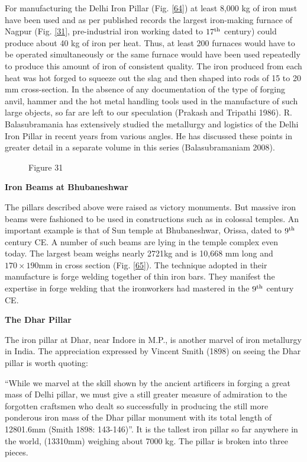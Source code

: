 For manufacturing the Delhi Iron Pillar (Fig. \ref{64}) at least 8,000 kg of iron must have been used and as per published records the largest iron-making furnace of Nagpur (Fig. \ref{31}, pre-industrial iron working dated to $17^{\rm th}$ century) could produce about 40 kg of iron per heat. Thus, at least 200 furnaces would have to be operated simultaneously or the same furnace would have been used repeatedly to produce this amount of iron of consistent quality. The iron produced from each heat was hot­ forged to squeeze out the slag and then shaped into rods of 15 to 20 mm cross-section. In the absence of any documentation of the type of forging anvil, hammer and the hot metal handling tools used in the manufacture of such large objects, so far are left to our speculation (Prakash and Tripathi 1986). R. Balasubramania has extensively studied the metallurgy and logistics of the Delhi Iron Pillar in recent years from various angles. He has discussed these points in greater detail in a separate volume in this series (Balasubramaniam 2008).
\begin{figure}[H]
\centerline{Figure 31}
\end{figure}

\noindent \textbf{\large Iron Beams at Bhubaneshwar}

The pillars described above were raised as victory monuments. But massive iron beams were fashioned to be used in constructions such as in colossal temples. An important example is that of Sun temple at Bhubaneshwar, Orissa, dated to $9^{\rm th}$ century CE. A number of such beams are lying in the temple complex even today. The largest beam weighs nearly 2721kg and is 10,668 mm long and $170 \times 190$mm in cross section  (Fig. \ref{65}). The technique adopted in their manufacture is forge welding together of thin iron bars. They manifest the expertise in forge welding that the ironworkers had mastered in the $9^{\rm th}$ century CE.

\noindent \textbf{\large The Dhar Pillar}

The iron pillar at Dhar, near Indore in M.P., is another marvel of iron metallurgy in India. The appreciation expressed by Vincent Smith (1898) on seeing the Dhar pillar is worth quoting: 

“While we marvel at the skill shown by the ancient artificers in forging a great mass of Delhi pillar, we must give a still greater measure of admiration to the forgotten craftsmen who dealt so successfully in producing the still more ponderous iron mass of the Dhar pillar monument with its total length of 12801.6mm (Smith 1898: 143-146)”. It is the tallest iron pillar so far anywhere in the world, (13310mm) weighing about 7000 kg. The pillar is broken into three pieces.

